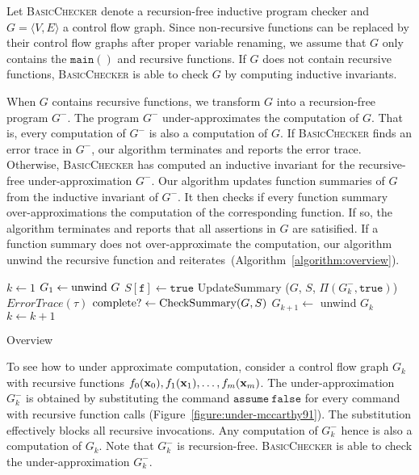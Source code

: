 
Let \textsc{BasicChecker} denote a recursion-free inductive program
checker and $G = \langle V, E \rangle$ a control flow graph. Since
non-recursive functions can be replaced by their control flow graphs
after proper variable renaming, we assume that $G$ only contains the
$\mathtt{main()}$ and recursive functions. If $G$ does not contain
recursive functions, \textsc{BasicChecker} is able to check $G$ by
computing inductive invariants.

When $G$ contains recursive functions, we transform $G$ into a
recursion-free program $G^-$. The program $G^-$
under-approximates the computation of $G$. That is, every computation
of $G^-$ is also a computation of $G$. If
\textsc{BasicChecker} finds an error trace in $G^-$, our
algorithm terminates and reports the error trace. Otherwise,
\textsc{BasicChecker} has computed an inductive invariant for the
recursive-free under-approximation $G^-$. Our algorithm
updates function summaries of $G$ from the inductive invariant of
$G^-$. It then checks if every function summary
over-approximations the computation of the corresponding function. If
so, the algorithm terminates and reports that all assertions in $G$
are satisified. If a function summary does not over-approximate the
computation, our algorithm unwind the recursive function and
reiterates~(Algorithm~\ref{algorithm:overview}).

\begin{algorithm}
  $k \leftarrow 1$\;
  $G_1 \leftarrow \textmd{unwind}\ G$\;
  {
    $S[\mathtt{f}] \leftarrow \mathtt{true}$\;
  }
  {
    {
      {    
        UpdateSummary ($G$, $S$, $\Pi (G^-_k, \mathtt{true})$)\;
      }
      {
        \Return $\mathit{ErrorTrace} (\tau)$\;
      }
    }
    $\textmd{complete?} \leftarrow \textmd{CheckSummary} (G, S)$\;
    $G_{k+1} \leftarrow $ unwind $G_k$\;
    $k \leftarrow k + 1$\;
  }
  \caption{Overview}
  \label{algorithm:overview}
\end{algorithm}

To see how to under approximate computation, consider a control flow
graph $G_k$ with recursive functions $f_0 (\textbf{x}_0), f_1 (\textbf{x}_1),
\ldots, f_m (\textbf{x}_m)$. The under-approximation $G^-_k$ is
obtained by substituting the command $\mathtt{assume\ false}$ for
every command with recursive function calls
(Figure~\ref{figure:under-mccarthy91}). The substitution
effectively blocks all recursive invocations. Any computation of
$G^-_k$ hence is also a computation of $G_k$. Note that
$G^-_k$ is recursion-free. \textsc{BasicChecker} is able to
check the under-approximation $G^-_k$.

